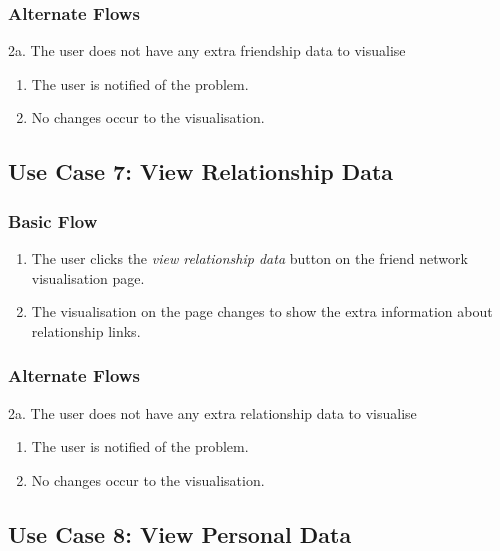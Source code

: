 \documentclass[12pt,onecolumn]{article}
\begin{document}
		\subsubsection{Alternate Flows}

		2a. The user does not have any extra friendship data to visualise

		\begin{enumerate}
			\item The user is notified of the problem.

			\item No changes occur to the visualisation.

		\end{enumerate}

	\subsection{Use Case 7: View Relationship Data}

		\subsubsection{Basic Flow}

		\begin{enumerate}
			\item The user clicks the \emph{view relationship data} button on the friend network visualisation page.

			\item The visualisation on the page changes to show the extra information about relationship links. 	

		\end{enumerate}

		\subsubsection{Alternate Flows}

		2a. The user does not have any extra relationship data to visualise

		\begin{enumerate}
			\item The user is notified of the problem.

			\item No changes occur to the visualisation.

		\end{enumerate}

	\subsection{Use Case 8: View Personal Data}
\end{document}
